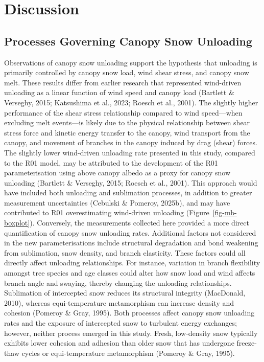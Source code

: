 \documentclass[
]{agujournal2019}
\begin{document}
\section{Discussion}\label{discussion}

\subsection{Processes Governing Canopy Snow
Unloading}\label{processes-governing-canopy-snow-unloading}

Observations of canopy snow unloading support the hypothesis that
unloading is primarily controlled by canopy snow load, wind shear
stress, and canopy snow melt. These results differ from earlier research
that represented wind-driven unloading as a linear function of wind
speed and canopy load (Bartlett \& Verseghy, 2015; Katsushima et al.,
2023; Roesch et al., 2001). The slightly higher performance of the shear
stress relationship compared to wind speed---when excluding melt
events---is likely due to the physical relationship between shear stress
force and kinetic energy transfer to the canopy, wind transport from the
canopy, and movement of branches in the canopy induced by drag (shear)
forces. The slightly lower wind-driven unloading rate presented in this
study, compared to the R01 model, may be attributed to the development
of the R01 parameterisation using above canopy albedo as a proxy for
canopy snow unloading (Bartlett \& Verseghy, 2015; Roesch et al., 2001).
This approach would have included both unloading and sublimation
processes, in addition to greater measurement uncertainties (Cebulski \&
Pomeroy, 2025b), and may have contributed to R01 overestimating
wind-driven unloading (Figure~\ref{fig-mb-boxplot}). Conversely, the
measurements collected here provided a more direct quantification of
canopy snow unloading rates. Additional factors not considered in the
new parameterisations include structural degradation and bond weakening
from sublimation, snow density, and branch elasticity. These factors
could all directly affect unloading relationships. For instance,
variation in branch flexibility amongst tree species and age classes
could alter how snow load and wind affects branch angle and swaying,
thereby changing the unloading relationships. Sublimation of intercepted
snow reduces its structural integrity (MacDonald, 2010), whereas
equi-temperature metamorphism can increase density and cohesion (Pomeroy
\& Gray, 1995). Both processes affect canopy snow unloading rates and
the exposure of intercepted snow to turbulent energy exchanges; however,
neither process emerged in this study. Fresh, low-density snow typically
exhibits lower cohesion and adhesion than older snow that has undergone
freeze-thaw cycles or equi-temperature metamorphism (Pomeroy \& Gray,
1995).
\end{document}
